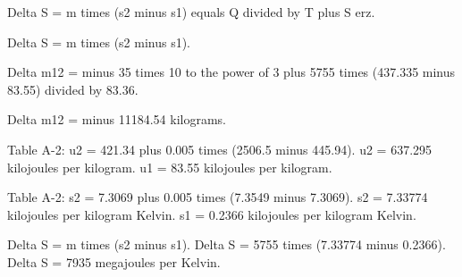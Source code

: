 Delta S = m times (s2 minus s1) equals Q divided by T plus S erz.  

Delta S = m times (s2 minus s1).  

Delta m12 = minus 35 times 10 to the power of 3 plus 5755 times (437.335 minus 83.55) divided by 83.36.  

Delta m12 = minus 11184.54 kilograms.  

Table A-2:  
u2 = 421.34 plus 0.005 times (2506.5 minus 445.94).  
u2 = 637.295 kilojoules per kilogram.  
u1 = 83.55 kilojoules per kilogram.  

Table A-2:  
s2 = 7.3069 plus 0.005 times (7.3549 minus 7.3069).  
s2 = 7.33774 kilojoules per kilogram Kelvin.  
s1 = 0.2366 kilojoules per kilogram Kelvin.  

Delta S = m times (s2 minus s1).  
Delta S = 5755 times (7.33774 minus 0.2366).  
Delta S = 7935 megajoules per Kelvin.